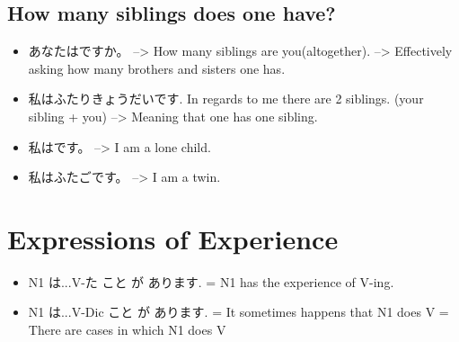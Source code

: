 \documentclass{article}
\begin{document}
\subsection*{How many siblings does one have?}
\begin{itemize}
\item あなたはですか。 --> How many siblings are you(altogether). --> Effectively asking how many brothers and sisters one has.
\item 私はふたりきょうだいです. In regards to me there are 2 siblings. (your sibling + you) --> Meaning that one has \color{red}one \color{black}sibling.
\item 私はです。 --> I am a lone child.
\item 私はふたごです。 --> I am a twin.
\end{itemize}
\section{Expressions of Experience}
\begin{itemize}
    \item N1 は...V-た  こと が あります. = N1 has the experience of V-ing.
    \item N1 は...V-Dic こと が あります. = It sometimes happens that N1 does V
                                     = There are cases in which N1 does V
\end{itemize}
\end{document}
